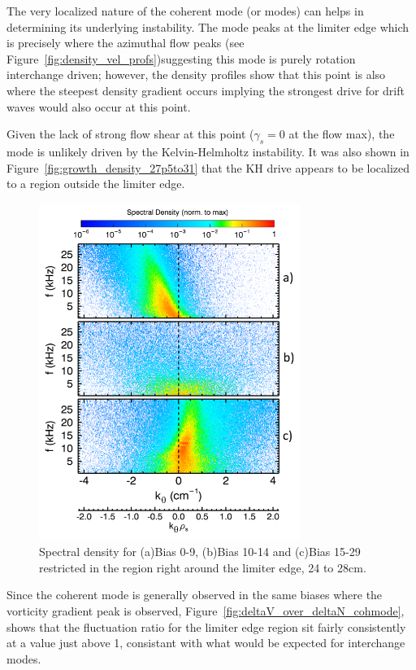 \documentclass[aip,pop,amsmath,amssymb,reprint,superscriptaddress]{revtex4-1} %
\begin{document}
The very localized nature of the coherent mode (or modes) can helps in determining its underlying instability. The mode peaks at the limiter edge which is precisely where the azimuthal flow peaks (see Figure~\ref{fig:density_vel_profs})suggesting this mode is purely rotation interchange driven; however, the density profiles show that this point is also where the steepest density gradient occurs implying the strongest drive for drift waves would also occur at this point. 

Given the lack of strong flow shear at this point ($\gamma_{s} = 0$ at the flow max), the mode is unlikely driven by the Kelvin-Helmholtz instability. It was also shown in Figure~\ref{fig:growth_density_27p5to31} that the KH drive appears to be localized to a region outside the limiter edge.

\begin{figure}[!htbp]
\centerline{
\includegraphics[width=8.5cm]{k_spec_byBias_24to28_lab}}%
\caption{\label{fig:k_spec_byBias_24to28} Spectral density for (a)Bias 0-9, (b)Bias 10-14 and (c)Bias 15-29 restricted in the region right around the limiter edge, 24 to 28cm.}
\end{figure}

Since the coherent mode is generally observed in the same biases where the vorticity gradient peak is observed,  Figure~\ref{fig:deltaV_over_deltaN_cohmode}, shows that the fluctuation ratio for the limiter edge region sit fairly consistently at a value just above 1, consistant with what would be expected for interchange modes.
\end{document}
